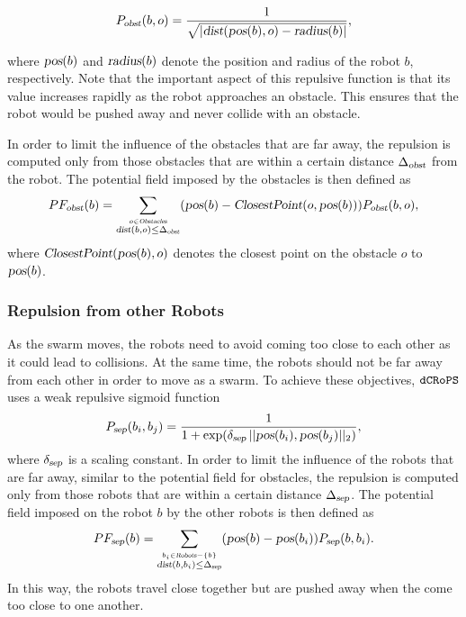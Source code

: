 \documentclass[letterpaper, 10pt, conference]{ieeeconf}
\newcommand{\Acronym}[1]{\ensuremath{{\small{\texttt{#1}}}}}
\newcommand{\Var}[1]{\ensuremath{{\small{\textsl{#1}}}}}
\newcommand{\Name}{\Acronym{dCRoPS}}
\begin{document}
$$
    P_\Var{obst}(b, o) = \frac{1}{\sqrt{|\Var{dist}(\Var{pos}(b), o) - \Var{radius}(b)|}},
$$

where $\Var{pos}(b)$ and $\Var{radius}(b)$ denote the position and radius of
the robot $b$, respectively. Note that the important aspect of this repulsive
function is that its value increases rapidly as the robot approaches an
obstacle. This ensures that the robot would be pushed away and never collide
with an obstacle.


In order to limit the influence of the obstacles that are far away,
the repulsion is computed only from those obstacles that are within a
certain distance $\Delta_\Var{obst}$ from the robot. The potential
field imposed by the obstacles is then defined as 
$$
PF_\Var{obst}(b) = \sum_{\stackrel{o \in
    \Var{Obstacles}}{\Var{dist}(b, o) \leq \Delta_\Var{obst}}} (\Var{pos}(b)
- \Var{ClosestPoint}(o, \Var{pos}(b))) P_\Var{obst}(b, o),
$$
where $\Var{ClosestPoint}(\Var{pos}(b), o)$ denotes the closest point on the
obstacle $o$ to $\Var{pos}(b)$.

\subsubsection{Repulsion from other Robots}
\label{sec:PFrobots} As the swarm moves,
the robots need to avoid coming too close to each other as it
could lead to collisions. At the same time, the robots should not be
far away from each other in order to move as a swarm. To achieve these
objectives, $\Name$ uses a weak repulsive sigmoid function
$$
P_\Var{sep}(b_i, b_j) = \frac{1}{1 +
  \exp(\delta_\Var{sep}\, ||\Var{pos}(b_i), \Var{pos}(b_j)||_2)},
$$
where $\delta_\Var{sep}$ is a scaling constant.
In order to limit the influence of the robots that are far away,
similar to the potential field for obstacles,
the repulsion is computed only from those robots that are within a
certain distance $\Delta_\Var{sep}$. The potential
field imposed on the robot $b$ by the other robots is then defined as 
$$
PF_\Var{sep}(b) = \sum_{\stackrel{b_i \in
    \Var{Robots} - \{b\}}{\Var{dist}(b, b_i) \leq \Delta_\Var{sep}}} (\Var{pos}(b)
- \Var{pos}(b_i)) P_\Var{sep}(b, b_i).
$$
In this way, the robots travel close together but are
pushed away when the come too close to one another.
\end{document}
